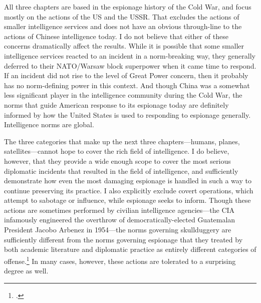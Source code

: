 \documentclass{memoir}
\begin{document}
\begin{refsegment}
All three chapters are based in the espionage history of the Cold War, and focus mostly on the actions of the US and the USSR. That excludes the actions of smaller intelligence services and does not have an obvious through-line to the actions of Chinese intelligence today. I do not believe that either of these concerns dramatically affect the results. While it is possible that some smaller intelligence services reacted to an incident in a norm-breaking way, they generally deferred to their NATO/Warsaw block superpower when it came time to respond. If an incident did not rise to the level of Great Power concern, then it probably has no norm-defining power in this context. And though China was a somewhat less significant player in the intelligence community during the Cold War, the norms that guide American response to its espionage today are definitely informed by how the United States is used to responding to espionage generally. Intelligence norms are global.


The three categories that make up the next three chapters---humans, planes, satellites---cannot hope to cover the rich field of intelligence. I do believe, however, that they provide a wide enough scope to cover the most serious diplomatic incidents that resulted in the field of intelligence, and sufficiently demonstrate how even the most damaging espionage is handled in such a way to continue preserving its practice. I also explicitly exclude covert operations, which attempt to sabotage or influence, while espionage seeks to inform. Though these actions are sometimes performed by civilian intelligence agencies---the CIA infamously engineered the overthrow of democratically-elected Guatemalan President Jacobo Arbenez in 1954---the norms governing skullduggery are sufficiently different from the norms governing espionage that they treated by both academic literature and diplomatic practice as entirely different categories of offense.\footcite{fraser_architecture_2005} In many cases, however, these actions are tolerated to a surprising degree as well.


\end{refsegment}
\end{document}
